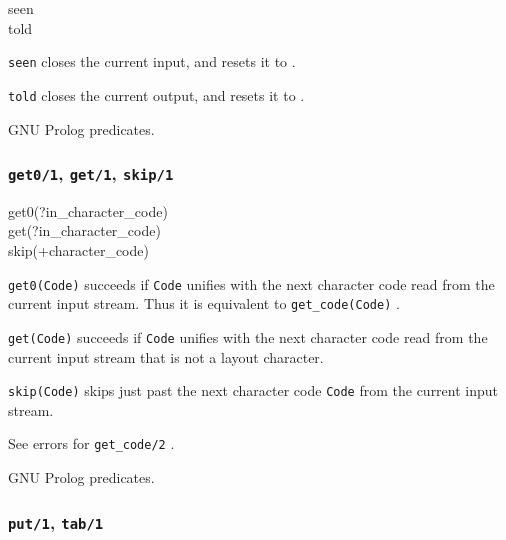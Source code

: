 \begin{TemplatesOneCol}
seen\\
told

\end{TemplatesOneCol}

\Description

\texttt{seen} closes the current input, and resets it to
.

\texttt{told} closes the current output, and resets it to
.

\PlErrorsNone

\Portability

GNU Prolog predicates.

\subsubsection{\texttt{get0/1},
               \texttt{get/1},
               \texttt{skip/1}}

\begin{TemplatesOneCol}
get0(?in\_character\_code)\\
get(?in\_character\_code)\\
skip(+character\_code)

\end{TemplatesOneCol}

\Description

\texttt{get0(Code)} succeeds if \texttt{Code} unifies with the next
character code read from the current input stream. Thus it is equivalent to
\texttt{get\_code(Code)} .

\texttt{get(Code)} succeeds if \texttt{Code} unifies with the next character
code read from the current input stream that is not a layout character.

\texttt{skip(Code)} skips just past the next character code \texttt{Code}
from the current input stream.

\Errors

See errors for \texttt{get\_code/2} .

\Portability

GNU Prolog predicates.

\subsubsection{\texttt{put/1},
               \texttt{tab/1}}

